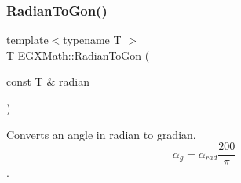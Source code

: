 \mbox{\label{group___e_g_x_math-_angle_conversions-_radian_ga36912e5a810b64c271c4dafc17f4ca45}} 
\subsubsection{\texorpdfstring{Radian\+To\+Gon()}{RadianToGon()}}
{\footnotesize\ttfamily template$<$typename T $>$ \\
T E\+G\+X\+Math\+::\+Radian\+To\+Gon (\begin{DoxyParamCaption}\item[{const T \&}]{radian }\end{DoxyParamCaption})}



Converts an angle in radian to gradian. \[\alpha_{g}=\alpha_{rad}\frac{200}{\pi}\]. 

